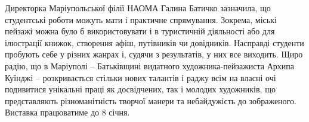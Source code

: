 
Директорка Маріупольської філії НАОМА Галина Батичко зазначила, що студентські
роботи можуть мати і практичне спрямування. Зокрема, міські пейзажі можна було
б використовувати і в туристичній діяльності або для ілюстрації книжок,
створення афіш, путівників чи довідників. Насправді студенти пробують себе у
різних жанрах і, судячи з результатів, у них все виходить. Щиро радію, що в
Маріуполі – Батьківщині видатного художника-пейзажиста Архипа Куїнджі –
розкривається стільки нових талантів і раджу всім на власні очі подивитися
унікальні праці як досвідчених, так і молодих художників, що представляють
різноманітність творчої манери та небайдужість до зображеного. Виставка
працюватиме до 8 січня.

